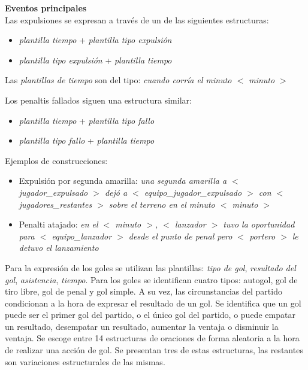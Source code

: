 \textbf{Eventos principales}\\


    Las expulsiones se expresan a través de un de las siguientes estructuras:
    \begin{itemize}
        \item \textit{plantilla tiempo} + \textit{plantilla tipo expulsión}
        \item \textit{plantilla tipo expulsión} + \textit{plantilla tiempo}
    \end{itemize}

    Las \textit{plantillas de tiempo} son del tipo: \textit{cuando corría el minuto $<$ minuto $>$}

    Los penaltis fallados siguen una estructura similar:
    \begin{itemize}
        \item \textit{plantilla tiempo} + \textit{plantilla tipo fallo}
        \item \textit{plantilla tipo fallo} + \textit{plantilla tiempo}
    \end{itemize}

    Ejemplos de construcciones: 

    \begin{itemize}
    \item Expulsión por segunda amarilla:  \textit{una segunda amarilla a $<$ jugador\_expulsado $>$ dejó 
    a $<$ equipo\_jugador\_expulsado $>$ con $<$ jugadores\_restantes $>$ sobre el terreno 
    en el minuto $<$ minuto $>$}
    
    \item Penalti atajado: \textit{en el $<$ minuto $>$, $<$ lanzador $>$ tuvo la oportunidad 
    para $<$ equipo\_lanzador $>$ desde el punto de penal pero $<$ portero $>$ le detuvo el lanzamiento}
    \end{itemize}


    Para la expresión de los goles se utilizan las plantillas: \textit{tipo de gol}, \textit{resultado del gol}, 
    \textit{asistencia}, \textit{tiempo}. Para los goles se identifican cuatro tipos: autogol, gol de tiro libre, 
    gol de penal y gol simple. A su vez, las circunstancias del partido condicionan a la hora de expresar el resultado 
    de un gol. Se identifica que un gol puede ser el primer gol del partido, o el único gol del partido, o puede empatar 
    un resultado, desempatar un resultado, aumentar la ventaja o disminuir la ventaja.
    Se escoge entre 14 estructuras de oraciones de forma aleatoria a la hora de realizar una acción de gol. Se presentan tres 
    de estas estructuras, las restantes son variaciones estructurales de las mismas.
    
